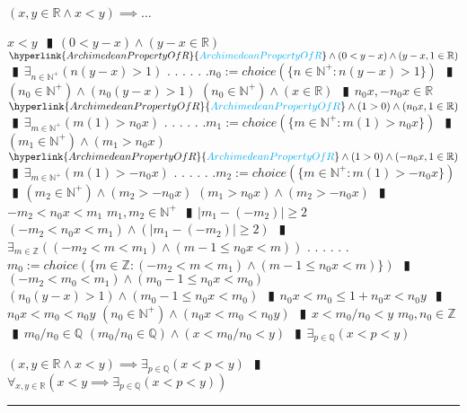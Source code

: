 \documentclass{book}
\newcommand{\rf}[1]{\hyperlink{#1}{\textcolor{cyan}{#1}}}
\newcommand{\abr}{:=}
\newcommand{\cont}{\phantom{.}. . .\phantom{.}}
\newcommand{\pipe}{$\phantom{(}\vrectangleblack\phantom{)}$}
\newcommand{\pr}[1]{\left(#1\right)}
\begin{document}
\begin{enumerate}
  \lit $(x, y \in \mathbb{R} \land x < y) \implies \ldots$
  \begin{enumerate}
    \lit $x < y$ \pipe $(0 < y - x) \land (y - x \in \mathbb{R})$
    \lit $\rf{ArchimedeanPropertyOfR} \land (0 < y - x) \land (y - x, 1 \in \mathbb{R})$ \pipe $\exists_{n \in \mathbb{N}^+}\pr{n (y - x) > 1}$ \cont
    \lit \cont $n_0 \abr choice\pr{\{n \in \mathbb{N}^+ : n (y - x) > 1\}}$ \pipe $(n_0 \in \mathbb{N}^+) \land \pr{n_0 (y - x) > 1}$
    \lit $(n_0 \in \mathbb{N}^+) \land (x \in \mathbb{R})$ \pipe $n_0 x, -n_0 x \in \mathbb{R}$
    \lit $\rf{ArchimedeanPropertyOfR} \land (1 > 0) \land (n_0 x, 1 \in \mathbb{\mathbb{R}})$ \pipe $\exists_{m \in \mathbb{N}^+}\pr{m (1) > n_0 x}$ \cont
    \lit \cont $m_1 \abr choice\pr{\{m \in \mathbb{N}^+ : m (1) > n_0 x\}}$ \pipe $(m_1 \in \mathbb{N}^+) \land (m_1 > n_0 x)$
    \lit $\rf{ArchimedeanPropertyOfR} \land (1 > 0) \land (-n_0 x, 1 \in \mathbb{\mathbb{R}})$ \pipe $\exists_{m \in \mathbb{N}^+}\pr{m (1) > -n_0 x}$ \cont
    \lit \cont $m_2 \abr choice\pr{\{m \in \mathbb{N}^+ : m (1) > -n_0 x\}}$ \pipe $(m_2 \in \mathbb{N}^+) \land (m_2 > -n_0 x)$
    \lit $(m_1 > n_0 x) \land (m_2 > -n_0 x)$ \pipe $-m_2 < n_0 x < m_1$
    \lit $m_1, m_2 \in \mathbb{N}^+$ \pipe $|m_1 - (-m_2)| \geq 2$
    \lit $(-m_2 < n_0 x < m_1) \land \pr{|m_1 - (-m_2)| \geq 2}$ \pipe $\exists_{m \in \mathbb{Z}}\pr{(-m_2 < m < m_1) \land (m - 1 \leq n_0 x < m)}$ \cont
    \lit \cont $m_0 \abr choice\pr{\{m \in \mathbb{Z} : (-m_2 < m < m_1) \land (m - 1 \leq n_0 x < m)\}}$ \pipe $(-m_2 < m_0 < m_1) \land (m_0 - 1 \leq n_0 x < m_0)$
    \lit $\pr{n_0 (y - x) > 1} \land (m_0 - 1 \leq n_0 x < m_0)$ \pipe $n_0 x < m_0 \leq 1 + n_0 x < n_0 y$ \pipe $n_0 x < m_0 < n_0 y$
    \lit $(n_0 \in \mathbb{N}^+) \land (n_0 x < m_0 < n_0 y)$ \pipe $x < m_0 / n_0 < y$
    \lit $m_0, n_0 \in \mathbb{Z}$ \pipe $m_0 / n_0 \in \mathbb{Q}$
    \lit $(m_0 / n_0 \in \mathbb{Q}) \land (x < m_0 / n_0 < y)$ \pipe $\exists_{p \in \mathbb{Q}}(x < p < y)$
  \end{enumerate}
  \lit $(x, y \in \mathbb{R} \land x < y) \implies \exists_{p \in \mathbb{Q}}(x < p < y)$ \pipe $\forall_{x, y \in \mathbb{R}}\pr{x < y \implies \exists_{p \in \mathbb{Q}}(x < p < y)}$
\end{enumerate} \vspace{.75mm} \hrule \vspace{.75mm} \ \\ 
\end{document}
